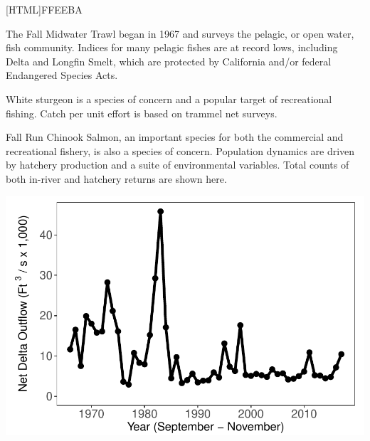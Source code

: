 \documentclass[]{article}\usepackage[]{graphicx}\usepackage[]{color}
\makeatletter
\def\maxwidth{ %
  \ifdim\Gin@nat@width>\linewidth
    \linewidth
  \else
    \Gin@nat@width
  \fi
}
\makeatother
\begin{document}
\begin{Row}
  \begin{Cell}{2}
    \setlength{\fboxrule}{1.7pt}
    [HTML]{FFEEBA}{\parbox{\textwidth}{
			\begin{itemize}[leftmargin=*]
				{\large 
					\item The Fall Midwater Trawl began in 1967 and surveys the pelagic, or 
					open water, fish community. Indices for many pelagic fishes are at record lows, 
					including Delta and Longfin Smelt, which are protected by California and/or 
					federal Endangered Species Acts.
					\item White sturgeon is a species of concern and a popular target of 
					recreational fishing. Catch per unit effort is based on trammel net surveys.
					\item Fall Run Chinook Salmon, an important species for both the commercial 
					and recreational fishery, is also a species of concern. Population dynamics 
					are driven by hatchery production and a suite of environmental variables. 
					Total counts of both in-river and hatchery returns are shown here.
				}
			\end{itemize}
    }}
  \end{Cell}
  \begin{Cell}{1}
    \vspace{-4.0cm}


{\centering \includegraphics[width=\maxwidth]{figures/flow_fig_3-1} 

}



  \end{Cell}
\end{Row}
\end{document}
